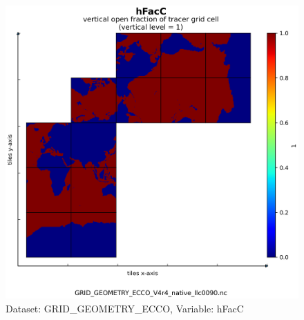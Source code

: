 \begin{figure}[H]
\centering
\includegraphics[scale=0.55]{../images/plots/native_plots_coords/Geometry_Parameters_for_the_Lat-Lon-Cap_90_(llc90)_Native_Model_Grid_(Version_4_Release_4)/hFacC.png}
\caption{Dataset: GRID\_GEOMETRY\_ECCO, Variable: hFacC}
\label{tab:table-GRID_GEOMETRY_ECCO_hFacC-Plot}
\end{figure}
\newpage
\pagebreak
